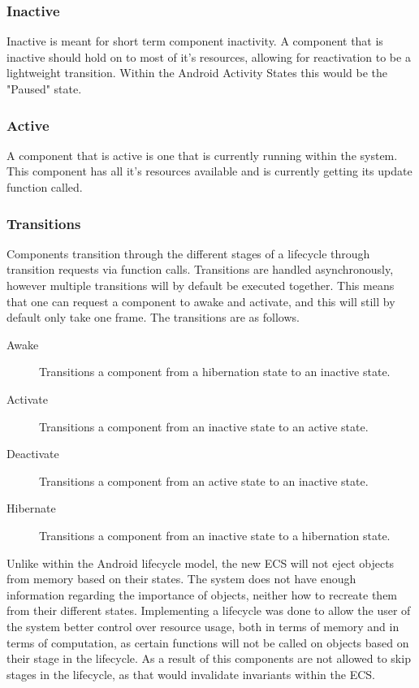 \subsubsection{Inactive}
Inactive is meant for short term component inactivity.
A component that is inactive should hold on to most of it's resources, allowing for reactivation to be a lightweight transition.
Within the Android Activity States this would be the "Paused" state.\cite[Activity state and ejection from memory]{android_activity_lifecycle}

\subsubsection{Active}
A component that is active is one that is currently running within the system.
This component has all it's resources available and is currently getting its update function called.

\subsubsection{Transitions}
Components transition through the different stages of a lifecycle through transition requests via function calls.
Transitions are handled asynchronously, however multiple transitions will by default be executed together.
This means that one can request a component to awake and activate, and this will still by default only take one frame.
The transitions are as follows.
\begin{description}
    \item
    [Awake] Transitions a component from a hibernation state to an inactive state.

    \item
    [Activate] Transitions a component from an inactive state to an active state.

    \item
    [Deactivate] Transitions a component from an active state to an inactive state.

    \item
    [Hibernate] Transitions a component from an inactive state to a hibernation state.
\end{description}

Unlike within the Android lifecycle model, the new ECS will not eject objects from memory based on their states.\cite[Activity state and ejection from memory]{android_activity_lifecycle}
The system does not have enough information regarding the importance of objects, neither how to recreate them from their different states.
Implementing a lifecycle was done to allow the user of the system better control over resource usage, both in terms of memory
and in terms of computation, as certain functions will not be called on objects based on their stage in the lifecycle.
As a result of this components are not allowed to skip stages in the lifecycle, as that would invalidate invariants within the ECS.
